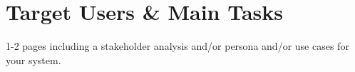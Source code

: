 \documentclass[requirements.tex]{subfiles}
\begin{document}
\section{Target Users \& Main Tasks} %
\label{sec:target_users_&_main_tasks}

1-2 pages including a stakeholder analysis and/or persona and/or use cases for
your system.

\newpage
\end{document}
